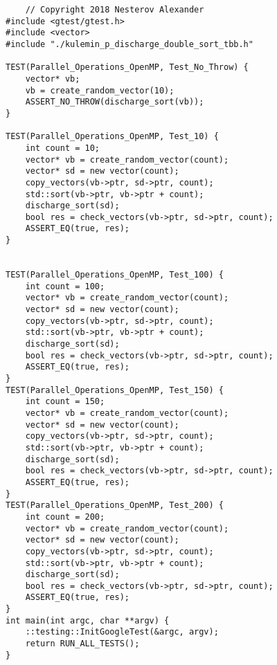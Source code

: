 \documentclass{report}
\begin{document}
\begin{lstlisting}
    // Copyright 2018 Nesterov Alexander
#include <gtest/gtest.h>
#include <vector>
#include "./kulemin_p_discharge_double_sort_tbb.h"

TEST(Parallel_Operations_OpenMP, Test_No_Throw) {
    vector* vb;
    vb = create_random_vector(10);
    ASSERT_NO_THROW(discharge_sort(vb));
}

TEST(Parallel_Operations_OpenMP, Test_10) {
    int count = 10;
    vector* vb = create_random_vector(count);
    vector* sd = new vector(count);
    copy_vectors(vb->ptr, sd->ptr, count);
    std::sort(vb->ptr, vb->ptr + count);
    discharge_sort(sd);
    bool res = check_vectors(vb->ptr, sd->ptr, count);
    ASSERT_EQ(true, res);
}


TEST(Parallel_Operations_OpenMP, Test_100) {
    int count = 100;
    vector* vb = create_random_vector(count);
    vector* sd = new vector(count);
    copy_vectors(vb->ptr, sd->ptr, count);
    std::sort(vb->ptr, vb->ptr + count);
    discharge_sort(sd);
    bool res = check_vectors(vb->ptr, sd->ptr, count);
    ASSERT_EQ(true, res);
}
TEST(Parallel_Operations_OpenMP, Test_150) {
    int count = 150;
    vector* vb = create_random_vector(count);
    vector* sd = new vector(count);
    copy_vectors(vb->ptr, sd->ptr, count);
    std::sort(vb->ptr, vb->ptr + count);
    discharge_sort(sd);
    bool res = check_vectors(vb->ptr, sd->ptr, count);
    ASSERT_EQ(true, res);
}
TEST(Parallel_Operations_OpenMP, Test_200) {
    int count = 200;
    vector* vb = create_random_vector(count);
    vector* sd = new vector(count);
    copy_vectors(vb->ptr, sd->ptr, count);
    std::sort(vb->ptr, vb->ptr + count);
    discharge_sort(sd);
    bool res = check_vectors(vb->ptr, sd->ptr, count);
    ASSERT_EQ(true, res);
}
int main(int argc, char **argv) {
    ::testing::InitGoogleTest(&argc, argv);
    return RUN_ALL_TESTS();
}
\end{lstlisting}
\end{document}
